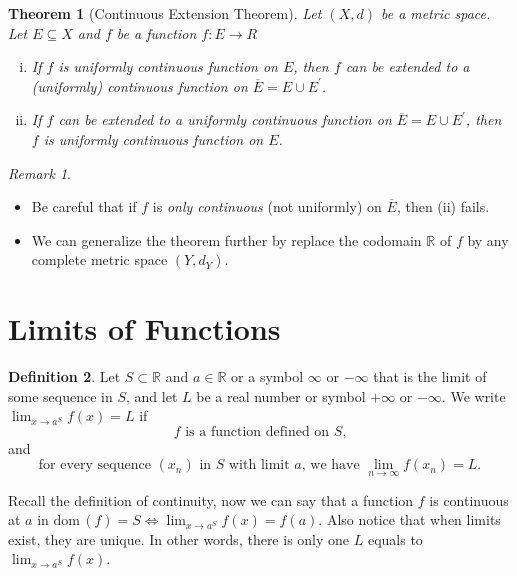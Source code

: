 \documentclass[12pt, lettersize]{book}
\theoremstyle{plain}
\newtheorem{thm}{Theorem}[section]
\theoremstyle{definition}
\newtheorem{dfn}[thm]{Definition}
\theoremstyle{remark}
\newtheorem*{rem}{Remark}
\newcommand{\R}{\mathbb{R}}
\newcommand{\dom}{\text{dom}\,}
\begin{document}
		\begin{thm}[Continuous Extension Theorem]
			Let $(X,d)$ be a metric space. Let $E\subseteq X$ and $f$ be a function $f:E\rightarrow R$
			\begin{enumerate}[(i)]
				\item If $f$ is uniformly continuous function on $E$, then $f$ can be extended to a (uniformly) continuous function on $\overline{E}=E\cup E^\prime$.
				\item If $f$ can be extended to a uniformly continuous function on $\overline{E}=E\cup E^\prime$, then $f$ is uniformly continuous function on $E$.
			\end{enumerate}
		\end{thm}
		\begin{rem}
		\begin{itemize}
			\item Be careful that if $f$ is \emph{only continuous} (not uniformly) on $\overline{E}$, then (ii) fails.
			\item We can generalize the theorem further by replace the codomain $\R$ of $f$ by any complete metric space $(Y,d_Y)$.
		\end{itemize}
		\end{rem}
		\newpage
		
		\section{Limits of Functions}
		\begin{dfn}
			Let $S\subset\R$ and $a\in\R$ or a symbol $\infty$ or $-\infty$ that is the limit of some sequence in $S$, and let $L$ be a real number or symbol $+\infty$ or $-\infty$. We write $\lim_{x\rightarrow a^S} f(x)=L$ if
			\begin{displaymath}
				\text{$f$ is a function defined on $S$,}
			\end{displaymath}
			and
			\begin{displaymath}
				\text{for every sequence $(x_n)$ in $S$ with limit $a$, we have $\lim_{n\rightarrow\infty}f(x_n)=L$}.
			\end{displaymath}
		\end{dfn}
		Recall the definition of continuity, now we can say that a function $f$ is continuous at $a$ in $\dom(f)=S \iff \lim_{x\rightarrow a^S} f(x)=f(a)$. Also notice that when limits exist, they are unique. In other words, there
		is only one $L$ equals to $\lim_{x\rightarrow a^S} f(x)$.  
		
\end{document}
